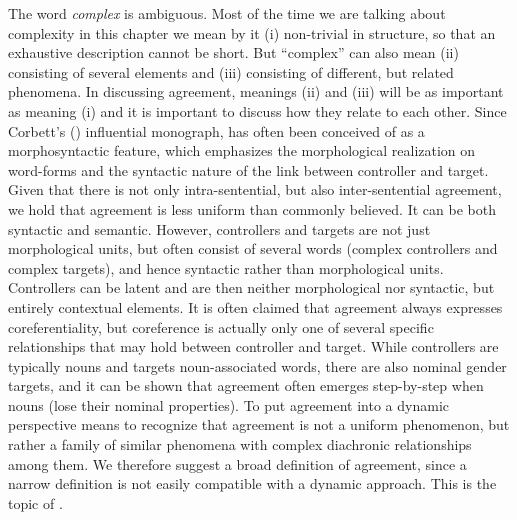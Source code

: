 \documentclass[output=collectionpaper]{langsci/langscibook}
\begin{document}
The word \textit{complex} is ambiguous. Most of the time we are talking about complexity in this chapter we mean by it (i) non-trivial in structure, so that an exhaustive description cannot be short. But ``complex'' can also mean (ii) consisting of several elements and (iii) consisting of different, but related phenomena. In discussing agreement, meanings (ii) and (iii) will be as important as meaning (i) and it is important to discuss how they relate to each other. Since Corbett's (\citeyear{Corbett2006}) influential monograph,  has often been conceived of as a morphosyntactic feature, which emphasizes the morphological realization on word-forms and the syntactic nature of the link between controller and target. Given that there is not only intra-sentential, but also inter-sentential agreement, we hold that agreement is less uniform than commonly believed. It can be both syntactic and semantic. However, controllers and targets are not just morphological units, but often consist of several words (complex controllers and complex targets), and hence syntactic rather than morphological units. Controllers can be latent and are then neither morphological nor syntactic, but entirely contextual elements. It is often claimed that agreement always expresses coreferentiality, but coreference is actually only one of several specific relationships that may hold between controller and target. While controllers are typically nouns and targets noun-associated words, there are also nominal gender targets, and it can be shown that agreement often emerges step-by-step when nouns  (lose their nominal properties). To put agreement into a dynamic perspective means to recognize that agreement is not a uniform phenomenon, but rather a family of similar phenomena with complex diachronic relationships among them. We therefore suggest a broad definition of agreement, since a narrow definition is not easily compatible with a dynamic approach. This is the topic of .
\end{document}
